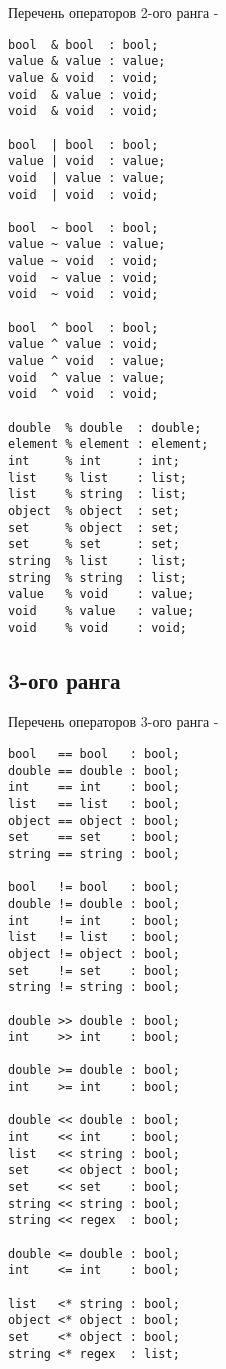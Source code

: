 \noindent Перечень операторов 2-ого ранга -
\begin{lstlisting}[numbers=none]
bool  & bool  : bool;
value & value : value;
value & void  : void;
void  & value : void;
void  & void  : void;

bool  | bool  : bool;
value | void  : value;
void  | value : value;
void  | void  : void;

bool  ~ bool  : bool;
value ~ value : value;
value ~ void  : void;
void  ~ value : void;
void  ~ void  : void;

bool  ^ bool  : bool;
value ^ value : void;
value ^ void  : value;
void  ^ value : value;
void  ^ void  : void;

double  % double  : double;
element % element : element;
int     % int     : int;
list    % list    : list;
list    % string  : list;
object  % object  : set;
set     % object  : set;
set     % set     : set;
string  % list    : list;
string  % string  : list;
value   % void    : value;
void    % value   : value;
void    % void    : void;
\end{lstlisting}

\subsection{3-ого ранга}

\noindent Перечень операторов 3-ого ранга -
\begin{lstlisting}[numbers=none]
bool   == bool   : bool;
double == double : bool;
int    == int    : bool;
list   == list   : bool;
object == object : bool;
set    == set    : bool;
string == string : bool;

bool   != bool   : bool;
double != double : bool;
int    != int    : bool;
list   != list   : bool;
object != object : bool;
set    != set    : bool;
string != string : bool;

double >> double : bool;
int    >> int    : bool;

double >= double : bool;
int    >= int    : bool;

double << double : bool;
int    << int    : bool;
list   << string : bool;
set    << object : bool;
set    << set    : bool;
string << string : bool;
string << regex  : bool;

double <= double : bool;
int    <= int    : bool;

list   <* string : bool;
object <* object : bool;
set    <* object : bool;
string <* regex  : list;
\end{lstlisting}

